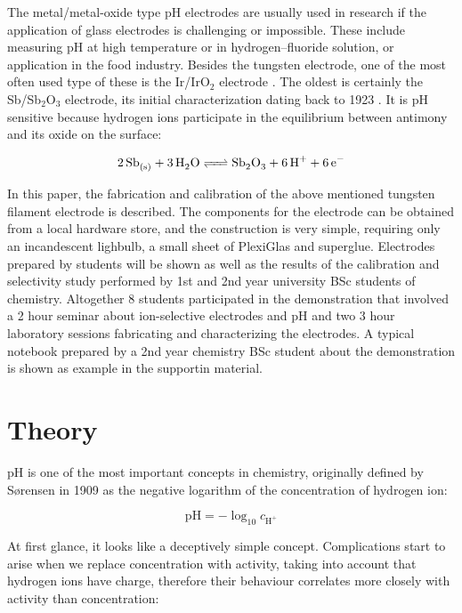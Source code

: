 \documentclass[manuscript=article, journal=jceda8]{achemso}
\begin{document}
The metal/metal-oxide type pH electrodes are usually used in research if the application of glass electrodes is challenging or impossible. These include measuring pH at high temperature or in hydrogen--fluoride solution, or application in the food industry. 
Besides the tungsten electrode, one of the most often used type of these is the Ir/IrO$_2$ electrode \cite{beyenal2004improved}.
The oldest is certainly the Sb/Sb$_2$O$_3$ electrode, its initial characterization dating back to 1923 \cite{uhl1923electrometric}.
It is pH sensitive because hydrogen ions participate in the equilibrium between antimony and its oxide on the surface:

\begin{equation}
        \ce{2Sb_{(s)} + 3H_2O <=> Sb_2O_3 + 6H^+ + 6e^-}
\end{equation}

In this paper, the fabrication and calibration of the above mentioned tungsten filament electrode is described. The components for the electrode can be obtained from a local hardware store, and the construction is very simple, requiring only an incandescent lighbulb, a small sheet of PlexiGlas and superglue. Electrodes prepared by students will be shown as well as the results of the calibration and selectivity study performed by 1st and 2nd year university BSc students of chemistry. Altogether 8 students participated in the demonstration that involved a 2 hour seminar about ion-selective electrodes and pH and two 3 hour laboratory sessions fabricating and characterizing the electrodes. A typical notebook prepared by a 2nd year chemistry BSc student about the demonstration is shown as example in the supportin material.

\section{Theory}

pH is one of the most important concepts in chemistry, originally defined by S\o rensen in 1909 \cite{sorensen1909messung} as the negative logarithm of the concentration of hydrogen ion:

\begin{equation}
\textrm{pH} = -\log_{10} c_{\textrm{H}^+}
\end{equation}

At first glance, it looks like a deceptively simple concept. Complications start to arise when we replace concentration with activity, taking into account that hydrogen ions have charge, therefore their behaviour correlates more closely with activity than concentration:
\end{document}
